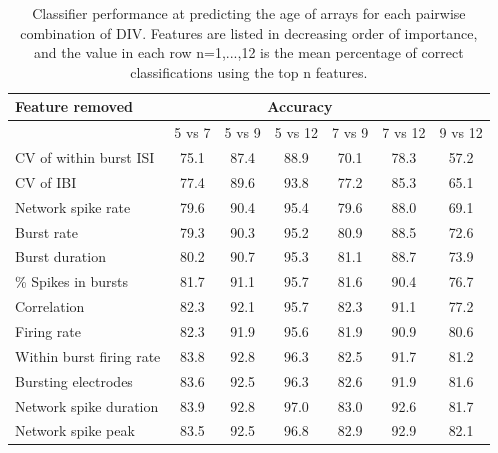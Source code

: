 \documentclass{article}
\begin{document}
\begin{table}
  \centering
  \begin{tabular}{|l|c|c|c|c|c|c|}
	  \hline
	  \textbf{Feature removed} & \multicolumn{5}{c}{\textbf{Accuracy}} & 
	  \\ \hline
	  & 5 vs 7 & 5 vs 9 & 5 vs 12 & 7 vs 9 & 7 vs 12 & 9 vs 12
	  \\ \hline 
		CV of within burst ISI & 75.1 & 87.4 & 88.9 & 70.1 & 78.3 & 57.2
		\\ CV of IBI & 77.4 & 89.6 & 93.8 & 77.2 & 85.3 & 65.1
		\\ Network spike rate& 79.6 & 90.4 & 95.4  & 79.6 & 88.0 & 69.1
		\\ Burst rate & 79.3 & 90.3 & 95.2 & 80.9 & 88.5 & 72.6
		\\ Burst duration& 80.2 & 90.7 & 95.3 & 81.1 & 88.7 & 73.9
		\\ \% Spikes in bursts & 81.7 & 91.1 & 95.7 & 81.6 & 90.4 & 76.7
		\\ Correlation & 82.3 & 92.1 & 95.7 & 82.3 & 91.1 & 77.2
		\\ Firing rate & 82.3 & 91.9 & 95.6 & 81.9 & 90.9 & 80.6
		\\ Within burst firing rate & 83.8 & 92.8 & 96.3 & 82.5 & 91.7 & 81.2
		\\ Bursting electrodes & 83.6 & 92.5 & 96.3 & 82.6 & 91.9 & 81.6
		\\ Network spike duration & 83.9 & 92.8 & 97.0 & 83.0 & 92.6 & 81.7
		\\ Network spike peak & 83.5 & 92.5 & 96.8 & 82.9 & 92.9 & 82.1
	\\ \hline
\end{tabular}
  \caption{Classifier performance at predicting the age of arrays for
    each pairwise combination of DIV. Features are listed in
    decreasing order of importance, and the value in each row
    n=1,...,12 is the mean percentage of correct classifications using
    the top n features.}
\end{table}
\end{document}
